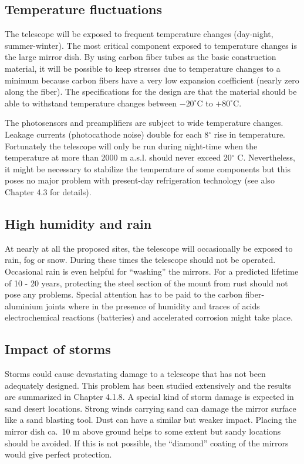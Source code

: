 \subsection{Temperature fluctuations}

\medskip The telescope will be exposed to frequent temperature changes (day-night,
summer-winter). The most critical component exposed to temperature changes
is the large mirror dish. By using carbon fiber tubes as the basic
construction material, it will be possible to keep stresses due to
temperature changes to a minimum because carbon fibers have a very low
expansion coefficient (nearly zero along the fiber). The specifications for
the design are that the material should be able to withstand temperature
changes between $-20^\circ$C to $+80^\circ$C.

The photosensors and preamplifiers are subject to wide temperature changes.
Leakage currents (photocathode noise) double for each 8$^\circ$ rise in
temperature. Fortunately the telescope will only be run during night-time
when the temperature at more than 2000 m a.s.l. should never exceed 20$^\circ$%
C. Nevertheless, it might be necessary to stabilize the temperature of some
components but this poses no major problem with present-day refrigeration
technology (see also Chapter 4.3 for details).

\subsection{High humidity and rain}

\medskip At nearly at all the proposed sites, the telescope will occasionally be
exposed to rain, fog or snow. During these times the telescope should not be
operated. Occasional rain is even helpful for ``washing'' the mirrors. For a
predicted lifetime of 10 - 20 years, protecting the steel section of the
mount from rust should not pose any problems. Special attention has to be
paid to the carbon fiber-aluminium joints where in the presence of
humidity and traces of acids electrochemical reactions (batteries) and
accelerated corrosion might take place.

\subsection{Impact of storms}

\medskip Storms could cause devastating damage to a telescope that has not been
adequately designed. This problem has been studied extensively and the
results are summarized in Chapter 4.1.8. A special kind of storm damage is
expected in sand desert locations. Strong winds carrying sand can damage the
mirror surface like a sand blasting tool. Dust can have a similar but weaker
impact. Placing the mirror dish ca.\, 10 m above ground helps to some extent
but sandy locations should be avoided. If this is not possible, the
``diamond'' coating of the mirrors would give perfect protection.


